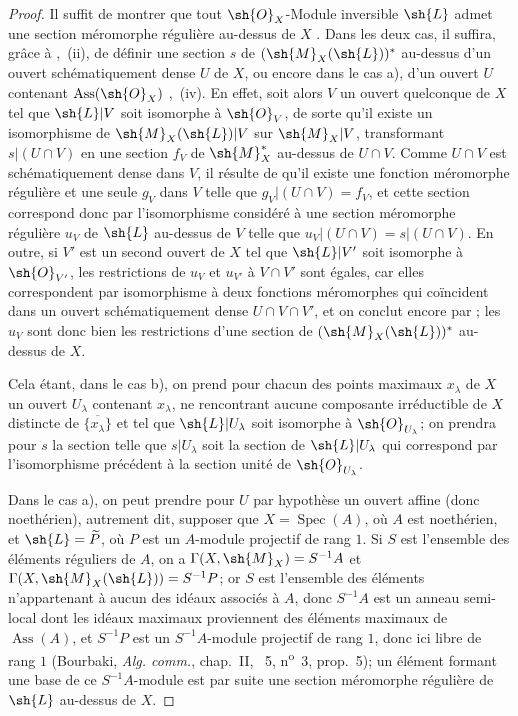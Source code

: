 \begin{proof}
Il suffit de montrer que tout $\sh{O}_X$-Module inversible $\sh{L}$ admet une section méromorphe régulière au-dessus de $X$ .
Dans les deux cas, il suffira, grâce à ,~(ii), de définir une section $s$ de $(\sh{M}_X(\sh{L}))^*$ au-dessus d'un ouvert schématiquement dense $U$ de $X$, ou encore dans le cas a), d'un ouvert $U$ contenant $\operatorname{Ass}(\sh{O}_X)$ ,~(iv).
En effet, soit alors $V$ un ouvert quelconque de $X$ tel que $\sh{L}|V$ soit isomorphe à $\sh{O}_V$, de sorte qu'il existe un isomorphisme de $\sh{M}_X(\sh{L})|V$ sur $\sh{M}_X|V$, transformant $s|(U\cap V)$ en une section $f_V$ de $\sh{M}_X^*$ au-dessus de $U\cap V$.
Comme $U\cap V$ est schématiquement dense dans $V$, il résulte de  qu'il existe une fonction méromorphe régulière et une seule $g_V$ dans $V$ telle que $g_V|(U\cap V)=f_V$, et cette section correspond donc par l'isomorphisme considéré à une section méromorphe régulière $u_V$ de $\sh{L}$ au-dessus de $V$ telle que $u_V|(U\cap V)=s|(U\cap V)$.
En outre, si $V'$ est un second ouvert de $X$ tel que $\sh{L}|V'$ soit isomorphe à $\sh{O}_{V'}$, les restrictions de $u_V$ et $u_{V'}$ à $V\cap V'$ sont égales, car elles correspondent par isomorphisme à deux fonctions méromorphes qui coïncident dans un ouvert schématiquement dense $U\cap V\cap V'$, et on conclut encore par ;
les $u_V$ sont donc bien les restrictions d'une section de $(\sh{M}_X(\sh{L}))^*$ au-dessus de $X$.

Cela étant, dans le cas b), on prend pour chacun des points maximaux $x_\lambda$ de $X$ un ouvert $U_\lambda$ contenant $x_\lambda$, ne rencontrant aucune composante irréductible de $X$ distincte de $\overline{\{x_\lambda\}}$ et tel que $\sh{L}|U_\lambda$ soit isomorphe à $\sh{O}_{U_\lambda}$;
on prendra pour $s$ la section telle que $s|U_\lambda$ soit la section de $\sh{L}|U_\lambda$ qui correspond par l'isomorphisme précédent à la section unité de $\sh{O}_{U_\lambda}$.

Dans le cas a), on peut prendre pour $U$ par hypothèse un ouvert affine (donc noethérien), autrement dit, supposer que $X=\operatorname{Spec}(A)$, où $A$ est noethérien, et $\sh{L}=\widetilde{P}$, où $P$ est un $A$-module projectif de rang $1$.
Si $S$ est l'ensemble des éléments réguliers de $A$, on a $\Gamma(X,\sh{M}_X)=S^{-1}A$  et $\Gamma(X,\sh{M}_X(\sh{L}))=S^{-1}P$;
or $S$ est l'ensemble des éléments n'appartenant à aucun des idéaux associés à $A$, donc $S^{-1}A$ est un anneau semi-local dont les idéaux maximaux proviennent des éléments maximaux de $\operatorname{Ass}(A)$, et $S^{-1}P$ est un $S^{-1}A$-module projectif de rang $1$, donc ici libre de rang $1$ (Bourbaki, \emph{Alg. comm.}, chap.~II, \textsection~5, n\textsuperscript{o}~3, prop.~5);
un élément formant une base de ce $S^{-1}A$-module est par suite  une section méromorphe régulière de $\sh{L}$ au-dessus de $X$.
\end{proof}


